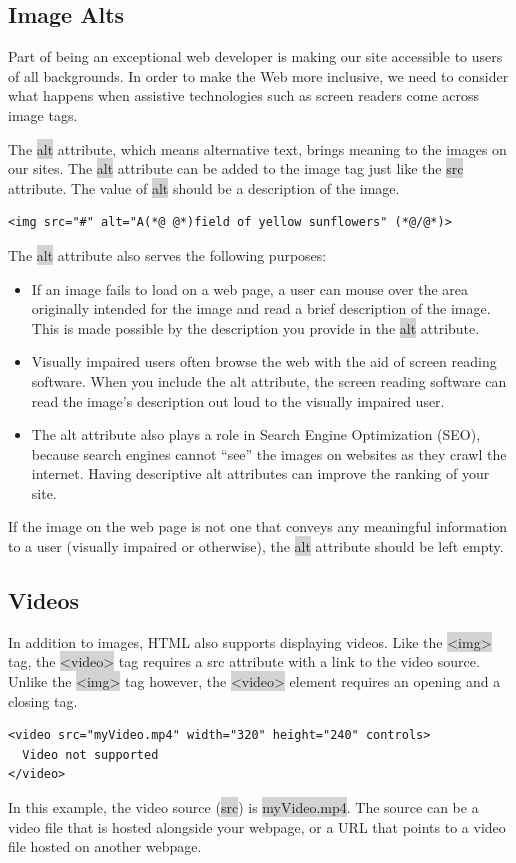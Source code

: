 \documentclass[11pt]{article}
\begin{document}
\subsection{Image Alts}
Part of being an exceptional web developer is making our site accessible to users of all backgrounds. In order to make the Web more inclusive, we need to consider what happens when assistive technologies such as screen readers come across image tags.

The \colorbox{lightgray}{alt} attribute, which means alternative text, brings meaning to the images on our sites. The \colorbox{lightgray}{alt} attribute can be added to the image tag just like the \colorbox{lightgray}{src} attribute. The value of \colorbox{lightgray}{alt} should be a description of the image.
\begin{lstlisting}
<img src="#" alt="A(*@ @*)field of yellow sunflowers" (*@/@*)>
\end{lstlisting}
The \colorbox{lightgray}{alt} attribute also serves the following purposes:
\begin{itemize}[leftmargin = *]
\item If an image fails to load on a web page, a user can mouse over the area originally intended for the image and read a brief description of the image. This is made possible by the description you provide in the \colorbox{lightgray}{alt} attribute.
\item Visually impaired users often browse the web with the aid of screen reading software. When you include the alt attribute, the screen reading software can read the image’s description out loud to the visually impaired user.
\item The alt attribute also plays a role in Search Engine Optimization (SEO), because search engines cannot “see” the images on websites as they crawl the internet. Having descriptive alt attributes can improve the ranking of your site.
\end{itemize}
If the image on the web page is not one that conveys any meaningful information to a user (visually impaired or otherwise), the \colorbox{lightgray}{alt} attribute should be left empty.

\subsection{Videos}
In addition to images, HTML also supports displaying videos. Like the \colorbox{lightgray}{<img>} tag, the \colorbox{lightgray}{<video>} tag requires a src attribute with a link to the video source. Unlike the \colorbox{lightgray}{<img>} tag however, the \colorbox{lightgray}{<video>} element requires an opening and a closing tag.
\begin{lstlisting}
<video src="myVideo.mp4" width="320" height="240" controls>
  Video not supported
</video>
\end{lstlisting}
In this example, the video source (\colorbox{lightgray}{src}) is \colorbox{lightgray}{myVideo.mp4}. The source can be a video file that is hosted alongside your webpage, or a URL that points to a video file hosted on another webpage.
\end{document}
